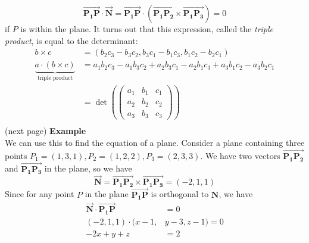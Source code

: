 \documentclass{report}
\begin{document}
\begin{equation*}
\overrightarrow{\mathbf{P_1P}}\cdot\overrightarrow{\mathbf{N}}=\overrightarrow{\mathbf{P_1P}}\cdot
(\overrightarrow{\mathbf{P_1P_2}}\times\overrightarrow{\mathbf{P_1P_3}})=0
\end{equation*}
if $P$ is within the plane. It turns out that this expression, called the \textit{triple product},
is equal to the determinant:
\begin{align*}
b\times c&=(b_2c_3-b_3c_2,b_3c_1-b_1c_3,b_1c_2-b_2c_1)\\
\underbrace{a\cdot(b\times c)}_{\text{triple product}}&=a_1b_2c_3-a_1b_3c_2+a_2b_3c_1-a_2b_1c_3+a_3b_1c_2-a_3b_2c_1\\
&=\det\left(
\begin{pmatrix}
a_1&b_1&c_1\\
a_2&b_2&c_2\\
a_3&b_3&c_3
\end{pmatrix}\right)\\
\end{align*}
(next page)
\newpage
\noindent\textbf{Example}\\
We can use this to find the equation of a plane. Consider a plane 
containing three points $P_1=(1,3,1), P_2=(1,2,2), P_3=(2,3,3)$. We have two vectors   
$\overrightarrow{\mathbf{P_1P_2}}$ and $\overrightarrow{\mathbf{P_1P_3}}$ in the plane, 
so we have 
\begin{equation*}
\overrightarrow{\mathbf{N}}=\overrightarrow{\mathbf{P_1P_2}}\times\overrightarrow{\mathbf{P_1P_3}}
=(-2,1,1)
\end{equation*}
Since for any point $P$ in the plane $\overrightarrow{\mathbf{P_1P}}$ is orthogonal to $\mathbf{N}$, we have
\begin{align*}
\overrightarrow{\mathbf{N}}\cdot\overrightarrow{\mathbf{P_1P}}&=0\\
(-2,1,1)\cdot(x-1,&y-3,z-1)=0\\
-2x+y+z&=2
\end{align*}
\newpage
\end{document}
